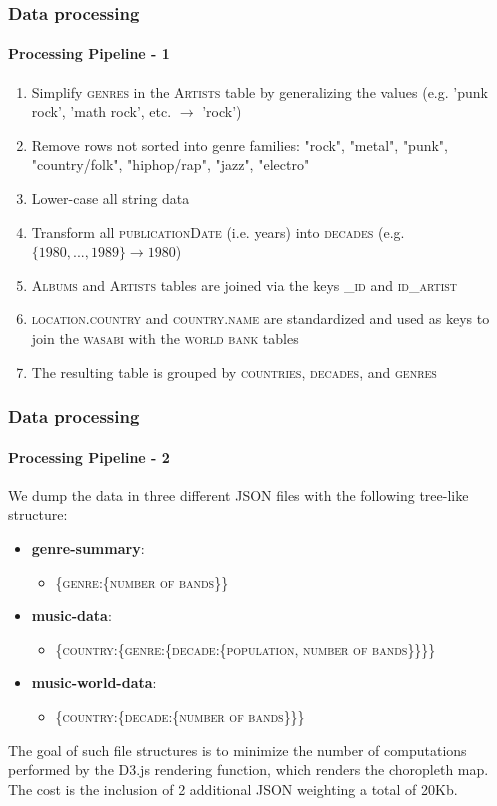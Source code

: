 \documentclass[aspectratio=43,10pt]{beamer}
\begin{document}
\begin{frame}
    \frametitle{Data processing}
    \framesubtitle{Processing Pipeline - 1}
    \small{
        \begin{enumerate}
            \item Simplify \textsc{genres} in the \textsc{Artists} table by generalizing the values (e.g. 'punk rock', 'math rock', etc. $\rightarrow$ 'rock')
            \item Remove rows not sorted into genre families: "rock", "metal", "punk", "country/folk", "hiphop/rap", "jazz", "electro"
            \item Lower-case all string data
            \item Transform all \textsc{publicationDate} (i.e. years) into \textsc{decades} (e.g. $\{1980, ..., 1989\} \rightarrow 1980$)
            \item \textsc{Albums} and \textsc{Artists} tables are joined via the keys \textsc{\_id} and \textsc{id\_artist}
            \item \textsc{location.country} and \textsc{country.name} are standardized and used as keys to join the \textsc{wasabi} with the \textsc{world bank} tables
            \item The resulting table is grouped by \textsc{countries}, \textsc{decades}, and \textsc{genres}
        \end{enumerate}
    }
\end{frame}

\begin{frame}
    \frametitle{Data processing}
    \framesubtitle{Processing Pipeline - 2}
    \small{
        We dump the data in three different JSON files with the following tree-like structure:
        \begin{itemize}
            \item \textbf{genre-summary}: 
            \begin{itemize}
                \item \footnotesize{\{\textsc{genre}:\{\textsc{number of bands}\}\}}
            \end{itemize}
            \item \textbf{music-data}: 
            \begin{itemize}
                \item \footnotesize{\{\textsc{country}:\{\textsc{genre}:\{\textsc{decade}:\{\textsc{population},  \textsc{number of bands}\}\}\}\}}
            \end{itemize}
            \item \textbf{music-world-data}: 
            \begin{itemize}
                \item \footnotesize{\{\textsc{country}:\{\textsc{decade}:\{\textsc{number of bands}\}\}\}}
            \end{itemize}
        \end{itemize}
    The goal of such file structures is to minimize the number of computations performed by the D3.js rendering function, which renders the choropleth map. The cost is the inclusion of 2 additional JSON weighting a total of 20Kb. 
    }
\end{frame}
\end{document}

